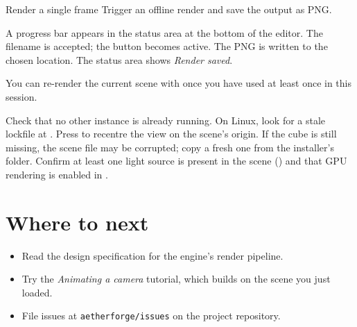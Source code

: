 \documentclass[11pt]{article}
\begin{document}
\begin{task}{Render a single frame}{%
  Trigger an offline render and save the output as PNG.}
\begin{stepresult}
     {A progress bar appears in the status area at the bottom of the
      editor.}
     {The filename is accepted; the  button becomes
      active.}
     {The PNG is written to the chosen location. The status area shows
      \emph{Render saved}.}
\end{stepresult}
\end{task}

\begin{UserTip}
You can re-render the current scene with  once you have used
 at least once in this session.
\end{UserTip}

\begin{troubleshooting}
     {Check that no other instance is already running. On Linux, look
      for a stale lockfile at .}
     {Press  to recentre the view on the scene's origin. If
      the cube is still missing, the scene file may be corrupted; copy
      a fresh one from the installer's  folder.}
     {Confirm at least one light source is present in the scene
      () and that GPU rendering
      is enabled in .}
\end{troubleshooting}

\section{Where to next}

\begin{itemize}
  \item Read the design specification for the engine's render pipeline.
  \item Try the \emph{Animating a camera} tutorial, which builds on the
        scene you just loaded.
  \item File issues at \texttt{aetherforge/issues} on the project
        repository.
\end{itemize}
\end{document}
